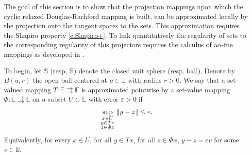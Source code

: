 \documentclass[12pt]{article}
\theoremstyle{definition}
\begin{document}
The goal of this section is to show that the projection mappings upon which the cyclic relaxed Douglas-Rachford
mapping is built, can be approximated locally by the projection onto the tangent spaces to the sets.  This
approximation requires the Shapiro property \eqref{e:Shapiro+}.  To link quantitatively
the regularity of sets to the corresponding regularity of this projectors
requires the calculus of a$\alpha$-fne mappings as developed in \cite{russell2018quantitative}.

To begin, let $\mathbb S$ (resp. $\mathbb B$) denote the closed unit sphere (resp. ball).
Denote by $B(a,r)$ the open ball centered at $a\in\mathbb E$ with radius $r>0$.
We say that a set-valued mapping $T:\mathbb E\rightrightarrows \mathbb E$ is approximated pointwise by a set-value mapping $\Phi:\mathbb E\rightrightarrows \mathbb E$ on a subset $U\subset \mathbb E$ with error $\varepsilon>0$ if 
\begin{equation}
\arraycolsep=1.4pt\def\arraystretch{.5}
\sup_{\begin{array}{cc}
\scriptstyle x\in U\\
\scriptstyle y\in Tx\\
\scriptstyle z\in \Phi x
\end{array}} \|y-z\|\le \varepsilon.
\end{equation}
Equivalently, for every $x\in U$, for all $y\in Tx$, for all $z\in \Phi x$, $y-z=\varepsilon v$ for some $v\in \mathbb B$.
\end{document}
